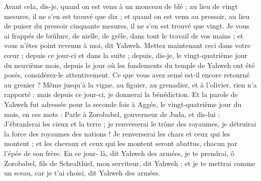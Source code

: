 \begin{multicols}{2}
Avant cela, dis-je, quand on est venu à un monceau de blé ; au lieu de vingt mesures, il ne s'en est trouvé que dix ; et quand on est venu au pressoir, au lieu de puiser du pressoir cinquante mesures, il ne s'en est trouvé que vingt.
Je vous ai frappés de brûlure, de nielle, de grêle, dans tout le travail de vos mains ; et vous n'êtes point revenus à moi, dit Yahweh.
Mettez maintenant ceci dans votre cœur ; depuis ce jour-ci et dans la suite ; depuis, dis-je, le vingt-quatrième jour du neuvième mois, depuis le jour où les fondements du temple de Yahweh ont été posés, considérez-le attentivement.
Ce que vous avez semé est-il encore retourné au grenier ? Même jusqu'à la vigne, au figuier, au grenadier, et à l'olivier, rien n'a rapporté ; mais depuis ce jour-ci, je donnerai la bénédiction.
Et la parole de Yahweh fut adressée pour la seconde fois à Aggée, le vingt-quatrième jour du mois, en ces mots :
Parle à Zorobabel, gouverneur de Juda, et dis-lui : J'ébranlerai les cieux et la terre ;
je renverserai le trône des royaumes, je détruirai la force des royaumes des nations ! Je renverserai les chars et ceux qui les montent ; et les chevaux et ceux qui les montent seront abattus, chacun par l'épée de son frère.
En ce jour- là, dit Yahweh des armées, je te prendrai, ô Zorobabel, fils de Schealthiel, mon serviteur, dit Yahweh ; et je te mettrai comme un sceau, car je t'ai choisi, dit Yahweh des armées.
\PPE{}
\end{multicols}
